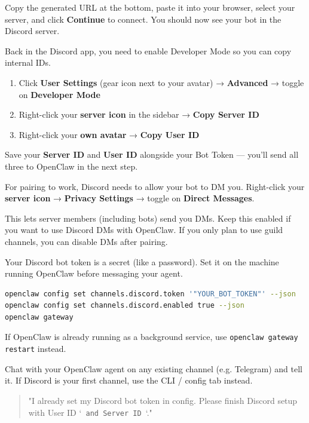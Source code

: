 Copy the generated URL at the bottom, paste it into your browser, select your server, and click \textbf{Continue} to connect. You should now see your bot in the Discord server.


Back in the Discord app, you need to enable Developer Mode so you can copy internal IDs.

\begin{enumerate}
  \item Click \textbf{User Settings} (gear icon next to your avatar) → \textbf{Advanced} → toggle on \textbf{Developer Mode}
  \item Right-click your \textbf{server icon} in the sidebar → \textbf{Copy Server ID}
  \item Right-click your \textbf{own avatar} → \textbf{Copy User ID}
\end{enumerate}


Save your \textbf{Server ID} and \textbf{User ID} alongside your Bot Token — you'll send all three to OpenClaw in the next step.


For pairing to work, Discord needs to allow your bot to DM you. Right-click your \textbf{server icon} → \textbf{Privacy Settings} → toggle on \textbf{Direct Messages}.

This lets server members (including bots) send you DMs. Keep this enabled if you want to use Discord DMs with OpenClaw. If you only plan to use guild channels, you can disable DMs after pairing.


Your Discord bot token is a secret (like a password). Set it on the machine running OpenClaw before messaging your agent.

\begin{lstlisting}[language=bash]
openclaw config set channels.discord.token '"YOUR_BOT_TOKEN"' --json
openclaw config set channels.discord.enabled true --json
openclaw gateway
\end{lstlisting}


If OpenClaw is already running as a background service, use \texttt{openclaw gateway restart} instead.



Chat with your OpenClaw agent on any existing channel (e.g. Telegram) and tell it. If Discord is your first channel, use the CLI / config tab instead.

\begin{quote}
"I already set my Discord bot token in config. Please finish Discord setup with User ID `\texttt{ and Server ID }`."
\end{quote}

